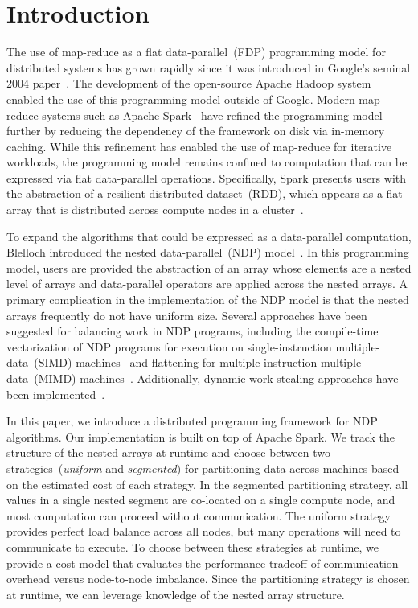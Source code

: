 \documentclass[preprint]{sigplanconf}
\theoremstyle{definition}
\begin{document}
\section{Introduction}
\label{sec:introduction}

The use of map-reduce as a flat data-parallel~(FDP) programming model for distributed systems has
grown rapidly since it was introduced in Google's seminal 2004 paper~\cite{dean04}. The development
of the open-source Apache Hadoop system enabled the use of this programming model outside of
Google. Modern map-reduce systems such as Apache Spark~\cite{zaharia10} have refined the
programming model further by reducing the dependency of the framework on disk via in-memory
caching. While this refinement has enabled the use of map-reduce for iterative workloads, the
programming model remains confined to computation that can be expressed via flat data-parallel
operations. Specifically, Spark presents users with the abstraction of a resilient distributed
dataset~(RDD), which appears as a flat array that is distributed across compute nodes in a
cluster~\cite{zaharia12}.

To expand the algorithms that could be expressed as a data-parallel computation, Blelloch introduced
the nested data-\linebreak parallel~(NDP) model~\cite{blelloch90thesis}. In this programming model,
users are provided the abstraction of an array whose elements are a nested level of arrays and
data-parallel operators are applied across the nested arrays. A primary complication in the implementation
of the NDP model is that the nested arrays frequently do not have uniform size. Several approaches
have been suggested for balancing work in NDP programs, including the compile-time vectorization of
NDP programs for execution on single-instruction multiple-data~(SIMD)
machines~\cite{blelloch90thesis, blelloch90compiling} and flattening for multiple-instruction
multiple-data~(MIMD) machines~\cite{bergstrom13}. Additionally, dynamic work-stealing approaches
have been implemented~\cite{bergstrom10}.

In this paper, we introduce a distributed programming framework for NDP algorithms. Our
implementation is built on top of Apache Spark. We track the structure of the nested arrays at runtime
and choose between two strategies~(\emph{uniform} and \emph{segmented}) for partitioning data
across machines based on the estimated cost of each strategy. In the segmented partitioning strategy,
all values in a single nested segment are co-located on a single compute node, and most computation
can proceed without communication. The uniform strategy provides perfect load balance across all
nodes, but many operations will need to communicate to execute. To choose between these strategies
at runtime, we provide a cost model that evaluates the performance tradeoff of communication overhead 
versus node-to-node imbalance. Since the partitioning strategy is chosen at runtime, we can leverage
knowledge of the nested array structure.
\end{document}
